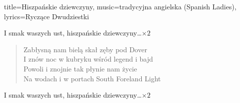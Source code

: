 \begin{song}{title={Hiszpańskie dziewczyny}, music={tradycyjna angielska (Spanish Ladies)}, lyrics={Ryczące Dwudziestki}}
\begin{chorus}
        I smak waszych ust, hiszpańskie dziewczyny\ldots $\times 2$
    \end{chorus}
    \begin{verse}
        Zabłysną nam bielą skał zęby pod Dover \\
        I znów noc w kubryku wśród legend i bajd \\
        Powoli i znojnie tak płynie nam życie \\
        Na wodach i w portach South Foreland Light\footnotemark{}
    \end{verse}
    \begin{chorus}
        I smak waszych ust, hiszpańskie dziewczyny\ldots $\times 2$
    \end{chorus}
\end{song}

